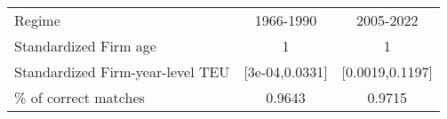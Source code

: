 
\begin{tabular}[t]{lcc}
\toprule
Regime & 1966-1990 & 2005-2022\\
Standardized Firm age & 1 & 1\\
Standardized Firm-year-level TEU & {}[3e-04,0.0331] & {}[0.0019,0.1197]\\
\% of correct matches & 0.9643 & 0.9715\\
\bottomrule
\end{tabular}
